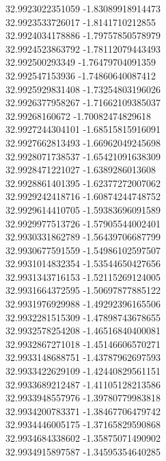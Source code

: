 {32.9923022351059	-1.83089918914473\\
32.9923533726017	-1.8141710212855\\
32.9924034178886	-1.79757850578979\\
32.9924523863792	-1.78112079443493\\
32.992500293349	-1.76479704091359\\
32.992547153936	-1.74860640087412\\
32.9925929831408	-1.73254803196026\\
32.9926377958267	-1.71662109385037\\
32.99268160672	-1.70082474829618\\
32.9927244304101	-1.68515815916091\\
32.9927662813493	-1.66962049245698\\
32.9928071738537	-1.65421091638309\\
32.9928471221027	-1.6389286013608\\
32.9928861401395	-1.62377272007062\\
32.9929242418716	-1.60874244748752\\
32.9929614410705	-1.59383696091589\\
32.9929977513726	-1.57905544002401\\
32.9930331862789	-1.56439706687799\\
32.9930677591559	-1.54986102597507\\
32.9931014832354	-1.53544650427656\\
32.9931343716153	-1.52115269124005\\
32.9931664372595	-1.50697877885122\\
32.9931976929988	-1.49292396165506\\
32.9932281515309	-1.47898743678655\\
32.9932578254208	-1.46516840400081\\
32.9932867271018	-1.45146606570271\\
32.9933148688751	-1.43787962697593\\
32.9933422629109	-1.42440829561151\\
32.9933689212487	-1.41105128213586\\
32.9933948557976	-1.39780779983818\\
32.9934200783371	-1.38467706479742\\
32.9934446005175	-1.37165829590868\\
32.9934684338602	-1.35875071490902\\
32.9934915897587	-1.34595354640285\\
}
